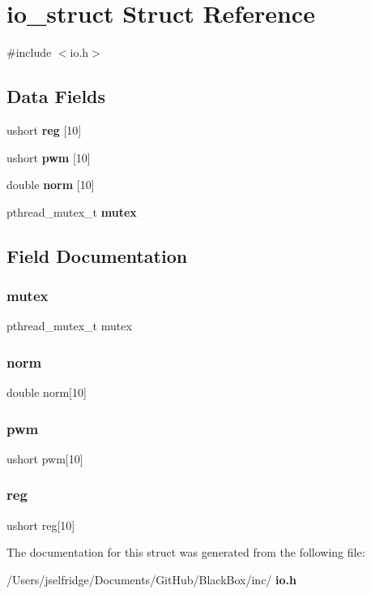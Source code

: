 \section{io\+\_\+struct Struct Reference}
\label{structio__struct}


{\ttfamily \#include $<$io.\+h$>$}

\subsection*{Data Fields}
\begin{DoxyCompactItemize}
\item 
ushort \textbf{ reg} [10]
\item 
ushort \textbf{ pwm} [10]
\item 
double \textbf{ norm} [10]
\item 
pthread\+\_\+mutex\+\_\+t \textbf{ mutex}
\end{DoxyCompactItemize}


\subsection{Field Documentation}
\mbox{\label{structio__struct_a4acff8232e4aec9cd5c6dc200ac55ef3}} 
\subsubsection{mutex}
{\footnotesize\ttfamily pthread\+\_\+mutex\+\_\+t mutex}

\mbox{\label{structio__struct_aad7f07b841cb44bec435feb14d0c48b7}} 
\subsubsection{norm}
{\footnotesize\ttfamily double norm[10]}

\mbox{\label{structio__struct_a75ce6c277b1cfe192d51c032ae2ea94e}} 
\subsubsection{pwm}
{\footnotesize\ttfamily ushort pwm[10]}

\mbox{\label{structio__struct_a049915c410b531f622fe72d1691bcfeb}} 
\subsubsection{reg}
{\footnotesize\ttfamily ushort reg[10]}



The documentation for this struct was generated from the following file\+:\begin{DoxyCompactItemize}
\item 
/\+Users/jselfridge/\+Documents/\+Git\+Hub/\+Black\+Box/inc/\textbf{ io.\+h}\end{DoxyCompactItemize}
